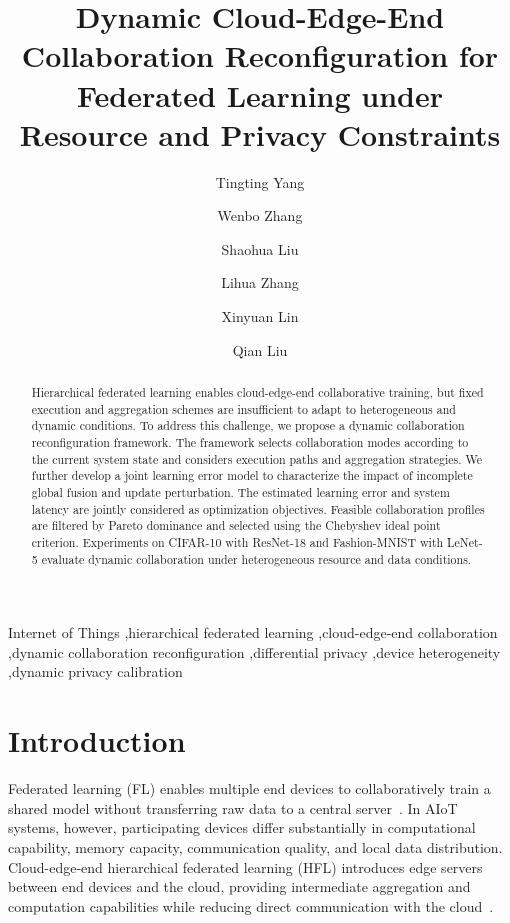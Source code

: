 \documentclass[5p,times]{elsarticle}
\theoremstyle{plain}
\theoremstyle{definition}
\theoremstyle{remark}
\begin{document}
\begin{frontmatter}

\title{Dynamic Cloud-Edge-End Collaboration Reconfiguration for Federated Learning under Resource and Privacy Constraints}

\author[bupt]{Tingting Yang}
\author[bupt]{Wenbo Zhang}
\author[bupt]{Shaohua Liu}
\author[bupt]{Lihua Zhang}
\author[bupt]{Xinyuan Lin}
\author[bupt]{Qian Liu}


\begin{abstract}
Hierarchical federated learning enables cloud-edge-end collaborative training, but fixed execution and aggregation schemes are insufficient to adapt to heterogeneous and dynamic conditions.
To address this challenge, we propose a dynamic collaboration reconfiguration framework.
The framework selects collaboration modes according to the current system state and considers execution paths and aggregation strategies.
We further develop a joint learning error model to characterize the impact of incomplete global fusion and update perturbation.
The estimated learning error and system latency are jointly considered as optimization objectives.
Feasible collaboration profiles are filtered by Pareto dominance and selected using the Chebyshev ideal point criterion.
Experiments on CIFAR-10 with ResNet-18 and Fashion-MNIST with LeNet-5 evaluate dynamic collaboration under heterogeneous resource and data conditions.
\end{abstract}

\begin{keyword} 
Internet of Things \sep hierarchical federated learning \sep cloud-edge-end collaboration \sep dynamic collaboration reconfiguration \sep differential privacy \sep device heterogeneity \sep dynamic privacy calibration
\end{keyword}

\end{frontmatter}
\section{Introduction}
\label{sec:introduction}
Federated learning (FL) enables multiple end devices to collaboratively train a shared model without transferring raw data to a central server~\cite{fedavg}. In AIoT systems, however, participating devices differ substantially in computational capability, memory capacity, communication quality, and local data distribution. Cloud-edge-end hierarchical federated learning (HFL) introduces edge servers between end devices and the cloud, providing intermediate aggregation and computation capabilities while reducing direct communication with the cloud~\cite{hfl}.
\end{document}
